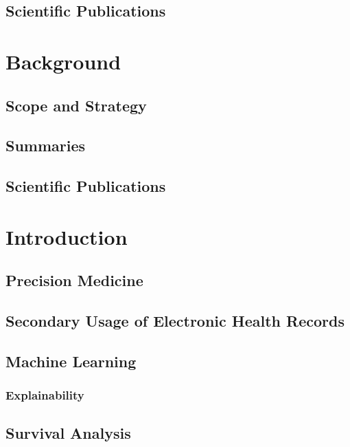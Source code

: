  


\chapter{Scientific Publications}



\part{Background}

\chapter{Scope and Strategy}
\chapter{Summaries}
\chapter{Scientific Publications}




\part{Introduction}
\chapter{Precision Medicine}
\chapter{Secondary Usage of Electronic Health Records}

\chapter{Machine Learning}
\section{Explainability}

\chapter{Survival Analysis}
